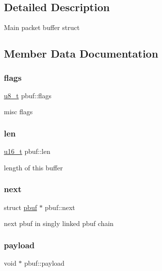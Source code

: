 \subsection{Detailed Description}
Main packet buffer struct 

\subsection{Member Data Documentation}
\mbox{\label{structpbuf_aa4d1af2cab3d9280d29212095b5b872a}} 
\subsubsection{\texorpdfstring{flags}{flags}}
{\footnotesize\ttfamily \hyperlink{group__compiler__abstraction_ga4caecabca98b43919dd11be1c0d4cd8e}{u8\+\_\+t} pbuf\+::flags}

misc flags \mbox{\label{structpbuf_a6f82449625e36e294f5d210268c0703f}} 
\subsubsection{\texorpdfstring{len}{len}}
{\footnotesize\ttfamily \hyperlink{group__compiler__abstraction_ga77570ac4fcab86864fa1916e55676da2}{u16\+\_\+t} pbuf\+::len}

length of this buffer \mbox{\label{structpbuf_a41ea0f0854e54c5b8492aebf096b9247}} 
\subsubsection{\texorpdfstring{next}{next}}
{\footnotesize\ttfamily struct \hyperlink{structpbuf}{pbuf} $\ast$ pbuf\+::next}

next pbuf in singly linked pbuf chain \mbox{\label{structpbuf_a11fb0edc141d71761d1f928c63c72c7e}} 
\subsubsection{\texorpdfstring{payload}{payload}}
{\footnotesize\ttfamily void $\ast$ pbuf\+::payload}

